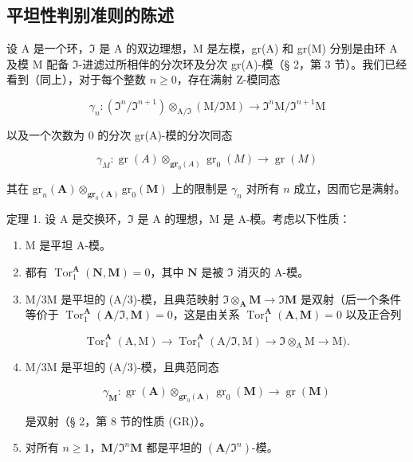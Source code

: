 \subsection{平坦性判别准则的陈述}

设 A 是一个环，\(\mathfrak{I}\) 是 A 的双边理想，M 是左模，gr(A) 和 gr(M) 分别是由环 A 及模 M 配备 \(\mathfrak{I}\)-进滤过所相伴的分次环及分次 gr(A)-模（§ 2，第 3 节）。我们已经看到（同上），对于每个整数 \(n \geqslant 0\)，存在满射 Z-模同态

\[
\gamma_ {n} \colon (\mathfrak {I} ^ {n} / \mathfrak {I} ^ {n + 1}) \otimes_ {\mathrm{A} / \mathfrak {I}} (\mathrm{M} / \mathfrak {I} \mathrm{M}) \rightarrow \mathfrak {I} ^ {n} \mathrm{M} / \mathfrak {I} ^ {n + 1} \mathrm{M}
\]

以及一个次数为 0 的分次 gr(A)-模的分次同态

\[
\gamma_ {M} \colon \operatorname{gr} (A) \otimes_ {\mathbf {g r} _ {0} (A)} \operatorname{gr} _ {0} (M) \to \operatorname{gr} (M)
\]

其在 \(\mathrm{gr}_n(\mathbf{A})\otimes_{\mathbf{gr}_0(\mathbf{A})}\mathrm{gr}_0(\mathbf{M})\) 上的限制是 \(\gamma_{n}\) 对所有 \(n\) 成立，因而它是满射。

定理 1. 设 A 是交换环，\(\Im\) 是 A 的理想，M 是 A-模。考虑以下性质：

\begin{enumerate}
\def\labelenumi{(\roman{enumi})}
\item
  M 是平坦 A-模。
\item
  都有 \(\operatorname{Tor}_1^{\mathbf{A}}(\mathbf{N},\mathbf{M}) = 0\)，其中 \(\mathbf{N}\) 是被 \(\Im\) 消灭的 A-模。
\item
  M/3M 是平坦的 (A/3)-模，且典范映射 \(\Im \otimes_{\mathbf{A}} \mathbf{M} \to \Im \mathbf{M}\) 是双射（后一个条件等价于 \(\operatorname{Tor}_{1}^{\mathbf{A}}(\mathbf{A}/\Im, \mathbf{M}) = 0\)，这是由关系 \(\operatorname{Tor}_{1}^{\mathbf{A}}(\mathbf{A}, \mathbf{M}) = 0\) 以及正合列

\[
\operatorname{Tor} _ {1} ^ {\mathbf {A}} (\mathrm{A}, \mathrm{M}) \rightarrow \operatorname{Tor} _ {1} ^ {\mathbf {A}} (\mathrm{A} / \Im , \mathrm{M}) \rightarrow \Im \otimes_ {\mathrm{A}} \mathrm{M} \rightarrow \mathrm{M}).
\]

\item
  M/3M 是平坦的 (A/3)-模，且典范同态

\[
\gamma_ {\mathbf {M}} \colon \operatorname{gr} (\mathbf {A}) \otimes_ {\mathbf {g r} _ {0} (\mathbf {A})} \operatorname{gr} _ {0} (\mathbf {M}) \rightarrow \operatorname{gr} (\mathbf {M})
\]

是双射（§ 2，第 8 节的性质 (GR)）。

\item
  对所有 \(n \geqslant 1\)，\(\mathbf{M} / \Im^n\mathbf{M}\) 都是平坦的 \((\mathbf{A} / \Im^n)\)-模。
\end{enumerate}

